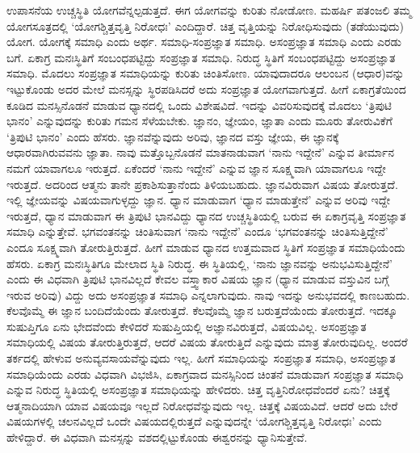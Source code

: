 ಉಪಾಸನೆಯ ಉಚ್ಚಸ್ಥಿತಿ ಯೋಗವೆನ್ನಲ್ಪಡುತ್ತದೆ. ಈಗ ಯೋಗವನ್ನು ಕುರಿತು ನೋಡೋಣ. ಮಹರ್ಷಿ ಪತಂಜಲಿ ತಮ್ಮ ಯೋಗಸೂತ್ರದಲ್ಲಿ `ಯೋಗಶ್ಚಿತ್ತವೃತ್ತಿ ನಿರೋಧಃ' ಎಂದಿದ್ದಾರೆ. ಚಿತ್ತ ವೃತ್ತಿಯನ್ನು ನಿರೋಧಿಸುವುದು (ತಡೆಯುವುದು) ಯೋಗ. ಯೋಗಕ್ಕೆ ಸಮಾಧಿ ಎಂದು ಅರ್ಥ. ಸಮಾಧಿ-ಸಂಪ್ರಜ್ಞಾತ ಸಮಾಧಿ. ಅಸಂಪ್ರಜ್ಞಾತ ಸಮಾಧಿ ಎಂದು ಎರಡು ಬಗೆ. ಏಕಾಗ್ರ ಮನಃಸ್ಥಿತಿಗೆ ಸಂಬಂಧಪಟ್ಟಿದ್ದು ಸಂಪ್ರಜ್ಞಾತ ಸಮಾಧಿ. ನಿರುದ್ಧ ಸ್ಥಿತಿಗೆ ಸಂಬಂಧಪಟ್ಟಿದ್ದು ಅಸಂಪ್ರಜ್ಞಾತ ಸಮಾಧಿ. ಮೊದಲು ಸಂಪ್ರಜ್ಞಾತ ಸಮಾಧಿಯನ್ನು ಕುರಿತು ಚಿಂತಿಸೋಣ. ಯಾವುದಾದರೂ ಆಲಂಬನ (ಆಧಾರ)ವನ್ನು ಇಟ್ಟುಕೊಂಡು ಅದರ ಮೇಲೆ ಮನಸ್ಸನ್ನು ಸ್ಥಿರಪಡಿಸಿದರೆ ಅದು ಸಂಪ್ರಜ್ಞಾತ ಯೋಗವಾಗುತ್ತದೆ. ಹೀಗೆ ಏಕಾಗ್ರತೆಯಿಂದ ಕೂಡಿದ ಮನಸ್ಸಿನೊಡನೆ ಮಾಡುವ ಧ್ಯಾನದಲ್ಲಿ ಒಂದು ವಿಶೇಷವಿದೆ. ಇದನ್ನು ವಿವರಿಸುವುದಕ್ಕೆ ಮೊದಲು `ತ್ರಿಪುಟಿ ಭಾನಂ' ಎನ್ನುವುದನ್ನು ಕುರಿತು ಗಮನ ಸೆಳೆಯಬೇಕು. ಜ್ಞಾನಂ, ಜ್ಞೇಯಂ, ಜ್ಞಾತಾ ಎಂದು ಮೂರು ತೋರುವಿಕೆಗೆ `ತ್ರಿಪುಟಿ ಭಾನಂ' ಎಂದು ಹೆಸರು. ಜ್ಞಾನವೆನ್ನುವುದು ಅರಿವು, ಜ್ಞಾನದ ವಸ್ತು ಜ್ಞೇಯ, ಈ ಜ್ಞಾನಕ್ಕೆ ಆಧಾರವಾಗಿರುವವನು ಜ್ಞಾತಾ. ನಾವು ಮತ್ತೊಬ್ಬನೊಡನೆ ಮಾತನಾಡುವಾಗ `ನಾನು ಇದ್ದೇನೆ' ಎನ್ನುವ ತೀರ್ಮಾನ ನಮಗೆ ಯಾವಾಗಲೂ ಇರುತ್ತದೆ. ಏಕೆಂದರೆ `ನಾನು ಇದ್ದೇನೆ' ಎನ್ನುವ ಜ್ಞಾನ ಸೂಕ್ಷ್ಮವಾಗಿ ಯಾವಾಗಲೂ ಇದ್ದೇ ಇರುತ್ತದೆ. ಅದರಿಂದ ಆತ್ಮನು ತಾನೇ ಪ್ರಕಾಶಿಸುತ್ತಾನೆಂದು ತಿಳಿಯಬಹುದು. ಜ್ಞಾನವಿರುವಾಗ ವಿಷಯ ತೋರುತ್ತದೆ. ಇಲ್ಲಿ ಜ್ಞೇಯವನ್ನು ವಿಷಯವಾಗುಳ್ಳದ್ದು ಜ್ಞಾನ. ಧ್ಯಾನ ಮಾಡುವಾಗ `ಧ್ಯಾನ ಮಾಡುತ್ತೇನೆ' ಎನ್ನುವ ಅರಿವು ಇದ್ದೇ ಇರುತ್ತದೆ, ಧ್ಯಾನ ಮಾಡುವಾಗ ಈ ತ್ರಿಪುಟಿ ಭಾನವಿದ್ದು ಧ್ಯಾನದ ಉಚ್ಚಸ್ಥಿತಿಯಲ್ಲಿ ಬರುವ ಈ ಏಕಾಗ್ರವೃತ್ತಿ ಸಂಪ್ರಜ್ಞಾತ ಸಮಾಧಿ ಎನ್ನುತ್ತೇವೆ. ಭಗವಂತನನ್ನು ಚಿಂತಿಸುವಾಗ `ನಾನು ಇದ್ದೇನೆ' ಎಂದೂ `ಭಗವಂತನನ್ನು ಚಿಂತಿಸುತ್ತಿದ್ದೇನೆ' ಎಂದೂ ಸೂಕ್ಷ್ಮವಾಗಿ ತೋರುತ್ತಿರುತ್ತದೆ. ಹೀಗೆ ಮಾಡುವ ಧ್ಯಾನದ ಉತ್ತಮವಾದ ಸ್ಥಿತಿಗೆ ಸಂಪ್ರಜ್ಞಾತ ಸಮಾಧಿಯೆಂದು ಹೆಸರು. ಏಕಾಗ್ರ ಮನಃಸ್ಥಿತಿಗೂ ಮೇಲಾದ ಸ್ಥಿತಿ ನಿರುದ್ಧ. ಈ ಸ್ಥಿತಿಯಲ್ಲಿ, `ನಾನು ಜ್ಞಾನವನ್ನು ಅನುಭವಿಸುತ್ತಿದ್ದೇನೆ' ಎಂದು ಈ ವಿಧವಾಗಿ ತ್ರಿಪುಟಿ ಭಾನವಿಲ್ಲದೆ ಕೇವಲ ವಸ್ತ್ವಾಕಾರ ವಿಷಯ ಜ್ಞಾನ (ಧ್ಯಾನ ಮಾಡುವ ವಸ್ತುವಿನ ಬಗ್ಗೆ ಇರುವ ಅರಿವು) ವಿದ್ದು ಅದು ಅಸಂಪ್ರಜ್ಞಾತ ಸಮಾಧಿ ಎನ್ನಲಾಗುವುದು. ನಾವು ಇದನ್ನು ಅನುಭವದಲ್ಲಿ ಕಾಣಬಹುದು. ಕೆಲವೊಮ್ಮೆ ಈ ಜ್ಞಾನ ಬಂದಿದೆಯೆಂದು ತೋರುತ್ತದೆ. ಕೆಲವೊಮ್ಮೆ ಜ್ಞಾನ ಬರುತ್ತದೆಯೆಂದು ತೋರುತ್ತದೆ. ಇದಕ್ಕೂ ಸುಷುಪ್ತಿಗೂ ಏನು ಭೇದವೆಂದು ಕೇಳಿದರೆ ಸುಷುಪ್ತಿಯಲ್ಲಿ ಅಜ್ಞಾನವಿರುತ್ತದೆ, ವಿಷಯವಿಲ್ಲ. ಅಸಂಪ್ರಜ್ಞಾತ ಸಮಾಧಿಯಲ್ಲಿ ವಿಷಯ ತೋರುತ್ತಿರುತ್ತದೆ, ಆದರೆ ವಿಷಯ ತೋರುತ್ತಿದೆ ಎನ್ನುವುದು ಮಾತ್ರ ತೋರುವುದಿಲ್ಲ. ಅಂದರೆ ತರ್ಕದಲ್ಲಿ ಹೇಳುವ ಅನುವ್ಯವಸಾಯವೆನ್ನುವುದು ಇಲ್ಲ. ಹೀಗೆ ಸಮಾಧಿಯನ್ನು ಸಂಪ್ರಜ್ಞಾತ ಸಮಾಧಿ, ಅಸಂಪ್ರಜ್ಞಾತ ಸಮಾಧಿಯೆಂದು ಎರಡು ವಿಧವಾಗಿ ವಿಭಜಿಸಿ, ಏಕಾಗ್ರವಾದ ಮನಸ್ಸಿನಿಂದ ಚಿಂತನೆ ಮಾಡುವಾಗ ಸಂಪ್ರಜ್ಞಾತ ಸಮಾಧಿ ಎನ್ನುವ ನಿರುದ್ಧ ಸ್ಥಿತಿಯಲ್ಲಿ ಅಸಂಪ್ರಜ್ಞಾತ ಸಮಾಧಿಯನ್ನು ಹೇಳಿದರು. ಚಿತ್ತ ವೃತ್ತಿನಿರೋಧವೆಂದರೆ ಏನು? ಚಿತ್ತಕ್ಕೆ ಆತ್ಮನಾದಿಯಾಗಿ ಯಾವ ವಿಷಯವೂ ಇಲ್ಲದೆ ನಿರೋಧವೆನ್ನುವುದು ಇಲ್ಲ. ಚಿತ್ತಕ್ಕೆ ವಿಷಯವಿದೆ. ಆದರೆ ಅದು ಬೇರೆ ವಿಷಯಗಳಲ್ಲಿ ಚಲನವಿಲ್ಲದೆ ಒಂದೇ ವಿಷಯದಲ್ಲಿರುತ್ತದೆ ಎನ್ನುವುದನ್ನೇ `ಯೋಗಶ್ಚಿತ್ತವೃತ್ತಿ ನಿರೋಧಃ' ಎಂದು ಹೇಳಿದ್ದಾರೆ. ಈ ವಿಧವಾಗಿ ಮನಸ್ಸನ್ನು ವಶದಲ್ಲಿಟ್ಟುಕೊಂಡು ಈಶ್ವರನನ್ನು ಧ್ಯಾನಿಸುತ್ತೇವೆ.

